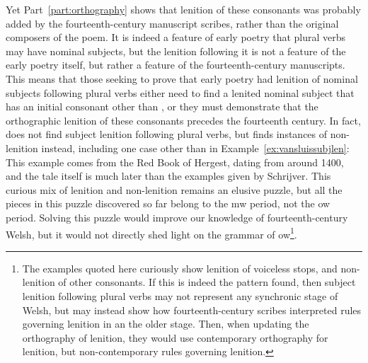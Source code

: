 Yet Part~\ref{part:orthography} shows that lenition of these consonants was probably added by the fourteenth-century manuscript scribes, rather than the original composers of the poem. It is indeed a feature of early poetry that plural verbs may have nominal subjects, but the lenition following it is not a feature of the early poetry itself, but rather a feature of the fourteenth-century manuscripts.
This means that those seeking to prove that early poetry had lenition of nominal subjects following plural verbs either need to find a lenited nominal subject that has an initial consonant other than , or they must demonstrate that the orthographic lenition of these consonants  precedes the fourteenth century. In fact, \textcite[65--66]{van_development14} does not find subject lenition following plural verbs, but finds instances of non-lenition instead, including one case other than  in Example~\ref{ex:vansluissubjlen}:
This example comes from the Red Book of Hergest, dating from around 1400, and the tale itself is much later than the examples given by Schrijver. This curious mix of lenition and non-lenition remains an elusive puzzle, but all the pieces in this puzzle discovered so far belong to the \gls{mw} period, not the \gls{ow} period. Solving this puzzle would improve our knowledge of fourteenth-century Welsh, but it would not directly shed light on the grammar of \gls{ow}\footnote{The examples quoted here curiously show lenition of voiceless stops, and non-lenition of other consonants. If this is indeed the pattern found, then subject lenition following plural verbs may not represent any synchronic stage of Welsh, but may instead show how  fourteenth-century scribes interpreted rules governing lenition in an  the older stage. Then, when updating the orthography of lenition, they would use contemporary orthography for lenition, but non-contemporary rules governing lenition.}.

